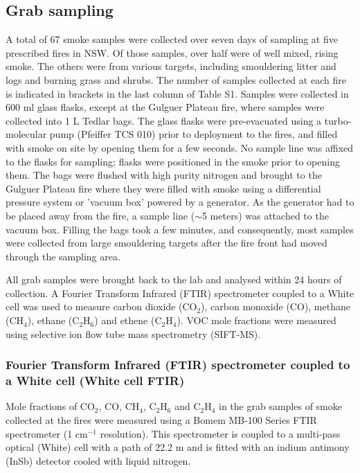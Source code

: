 \documentclass[acp, manuscript]{copernicus}
\begin{document}
\subsection{Grab sampling}
A total of 67 smoke samples were collected over seven days of sampling at five prescribed fires in NSW. Of those samples, over half were of well mixed, rising smoke. The others were from various targets, including smouldering litter and logs and burning grass and shrubs. The number of samples collected at each fire is indicated in brackets in the last column of Table S1. 
Samples were collected in 600 ml glass flasks, except at the Gulguer Plateau fire, where samples were collected into 1 L Tedlar bags. The glass flasks were pre-evacuated using a turbo-molecular pump (Pfeiffer TCS 010) prior to deployment to the fires, and filled with smoke on site by opening them for a few seconds. No sample line was affixed to the flasks for sampling; flasks were positioned in the smoke prior to opening them. The bags were flushed with high purity nitrogen and brought to the Gulguer Plateau fire where they were filled with smoke using a differential pressure system or 'vacuum box' powered by a generator. As the generator had to be placed away from the fire, a sample line ($\sim$5 meters) was attached to the vacuum box. Filling the bags took a few minutes, and consequently, most samples were collected from large smouldering targets after the fire front had moved through the sampling area. 

All grab samples were brought back to the lab and analysed within 24 hours of collection. A Fourier Transform Infrared (FTIR) spectrometer coupled to a White cell was used to measure carbon dioxide (CO$_2$), carbon monoxide (CO), methane (CH$_4$), ethane (C$_2$H$_6$) and ethene (C$_2$H$_4$). VOC mole fractions were measured using selective ion flow tube mass spectrometry (SIFT-MS).


\subsubsection{Fourier Transform Infrared (FTIR) spectrometer coupled to a White cell (White cell FTIR)}
Mole fractions of CO$_2$, CO, CH$_4$, C$_2$H$_6$ and C$_2$H$_4$ in the grab samples of smoke collected at the fires were measured using a Bomem MB-100 Series FTIR spectrometer (1 cm$^{-1}$ resolution). This spectrometer is coupled to a multi-pass optical (White) cell with a path of 22.2 m and is fitted with an indium antimony (InSb) detector cooled with liquid nitrogen. 
\end{document}

